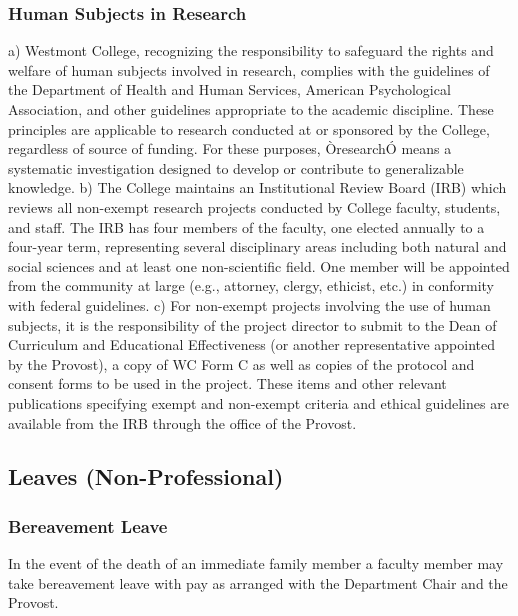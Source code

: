 \documentclass[letterpaper, 11pt]{article}
\begin{document}
		\subsubsection{Human Subjects in Research}
			a) Westmont College, recognizing the responsibility to safeguard the rights and welfare of human subjects involved in research, complies with the guidelines of the Department of Health and Human Services, American Psychological Association, and other guidelines appropriate to the academic discipline.  These principles are applicable to research conducted at or sponsored by the College, regardless of source of funding.  For these purposes, ÒresearchÓ means a systematic investigation designed to develop or contribute to generalizable knowledge.
			b) The College maintains an Institutional Review Board (IRB) which reviews all non-exempt research projects conducted by College faculty, students, and staff.  The IRB has four members of the faculty, one elected annually to a four-year term, representing several disciplinary areas including both natural and social sciences and at least one non-scientific field.  One member will be appointed from the community at large (e.g., attorney, clergy, ethicist, etc.) in conformity with federal guidelines.
			c) For non-exempt projects involving the use of human subjects, it is the responsibility of the project director to submit to the Dean of Curriculum and Educational Effectiveness (or another representative appointed by the Provost), a copy of WC Form C as well as copies of the protocol and consent forms to be used in the project.  These items and other relevant publications specifying exempt and non-exempt criteria and ethical guidelines are available from the IRB through the office of the Provost.
	\subsection{Leaves (Non-Professional)}
		\subsubsection{Bereavement Leave}
			In the event of the death of an immediate family member a faculty member may take bereavement leave with pay as arranged with the Department Chair and the Provost.
\end{document}
